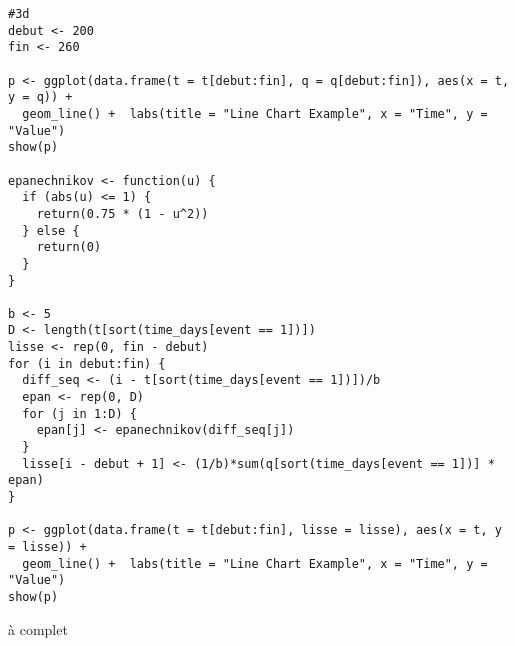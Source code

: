 \documentclass[../main.tex]{subfiles}
\begin{document}
\begin{CJK*}{UTF8}{gbsn}
\begin{lstlisting}
#3d
debut <- 200
fin <- 260

p <- ggplot(data.frame(t = t[debut:fin], q = q[debut:fin]), aes(x = t, y = q)) +
  geom_line() +  labs(title = "Line Chart Example", x = "Time", y = "Value")
show(p)

epanechnikov <- function(u) {
  if (abs(u) <= 1) {
    return(0.75 * (1 - u^2))
  } else {
    return(0)
  }
}

b <- 5
D <- length(t[sort(time_days[event == 1])])
lisse <- rep(0, fin - debut)
for (i in debut:fin) {
  diff_seq <- (i - t[sort(time_days[event == 1])])/b
  epan <- rep(0, D)
  for (j in 1:D) {
    epan[j] <- epanechnikov(diff_seq[j])
  }
  lisse[i - debut + 1] <- (1/b)*sum(q[sort(time_days[event == 1])] * epan)
}

p <- ggplot(data.frame(t = t[debut:fin], lisse = lisse), aes(x = t, y = lisse)) +
  geom_line() +  labs(title = "Line Chart Example", x = "Time", y = "Value")
show(p)

\end{lstlisting}


à complet

\end{CJK*}
\end{document}

